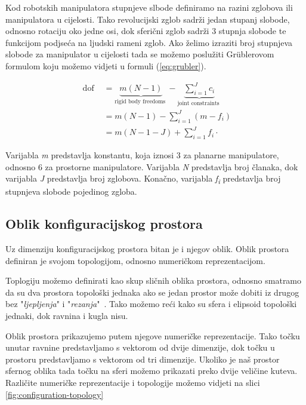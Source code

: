 \documentclass[times, utf8, diplomskirad]{fer}
\begin{document}
Kod robotskih manipulatora stupnjeve slbode definiramo na razini zglobova ili manipulatora u cijelosti.
Tako revolucijski zglob sadrži jedan stupanj slobode, odnosno rotaciju oko jedne osi, dok sferični zglob sadrži 3 stupnja slobode te funkcijom podjseća na ljudski rameni zglob.
Ako želimo izraziti broj stupnjeva slobode za manipulator u cijelosti tada se možemo poslužiti Grüblerovom formulom koju možemo vidjeti u formuli (\ref{eq:grubler}).

\begin{equation}
    \begin{aligned}
        \text { dof } &=\underbrace{m(N-1)}_{\text {rigid body freedoms }}-\underbrace{\sum_{i=1}^{J} c_{i}}_{\text {joint constraints }} \\
        &=m(N-1)-\sum_{i=1}^{J}\left(m-f_{i}\right) \\
        &=m(N-1-J)+\sum_{i=1}^{J} f_{i} \cdot
    \end{aligned}
    \label{eq:grubler}
\end{equation}

Varijabla \textit{m} predstavlja konstantu, koja iznosi 3 za planarne manipulatore, odnosno 6 za prostorne manipulatore.
Varijabla \textit{N} predstavlja broj članaka, dok varijabla \textit{J} predstavlja broj zglobova.
Konačno, varijabla \textit{f\textsubscript{i}} predstavlja broj stupnjeva slobode pojedinog zgloba.

\subsection{Oblik konfiguracijskog prostora}
Uz dimenziju konfiguracijskog prostora bitan je i njegov oblik.
Oblik prostora definiran je svojom topologijom, odnosno numeričkom reprezentacijom.

Toplogiju možemo definirati kao skup sličnih oblika prostora, odnosno smatramo da su dva prostora topološki jednaka
ako se jedan prostor može dobiti iz drugog bez "\textit{ljepljenja}" i "\textit{rezanja}"~\cite{10.5555/3165183}.
Tako možemo reći kako su sfera i elipsoid topološki jednaki, dok ravnina i kugla nisu.

Oblik prostora prikazujemo putem njegove numeričke reprezentacije.
Tako točku unutar ravnine predstavljamo s vektorom od dvije dimenzije, dok točku u prostoru predstavljamo s vektorom od tri dimenzije.
Ukoliko je naš prostor sfernog oblika tada točku na sferi možemo prikazati preko dvije veličine kuteva.
Različite numeričke reprezentacije i topologije možemo vidjeti na slici \ref{fig:configuration-topology}
\end{document}
